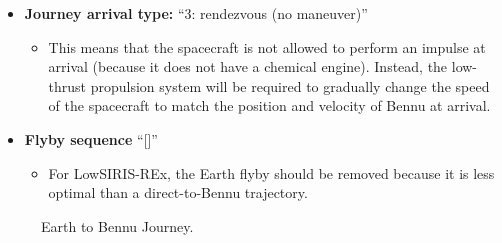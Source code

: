 \documentclass[11pt]{article}
\begin{document}
\begin{itemize}
	\item \textbf{Journey arrival type:} ``3: rendezvous (no maneuver)''
	\begin{itemize}
		\item This means that the spacecraft is not allowed to perform an impulse at arrival (because it does not have a chemical engine). Instead, the low-thrust propulsion system will be required to gradually change the speed of the spacecraft to match the position and velocity of Bennu at arrival.
	\end{itemize}
	\item \textbf{Flyby sequence} ``[]''
	\begin{itemize}
		\item For LowSIRIS-REx, the Earth flyby should be removed because it is less optimal than a direct-to-Bennu trajectory.
	\end{itemize}
\end{itemize}

\begin{figure}
	\centering
	\caption{\label{fig:earth_to_bennu_journey_options}Earth to Bennu Journey.}
\end{figure}
\end{document}
